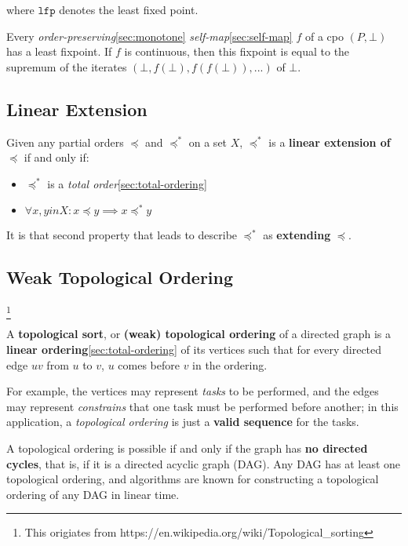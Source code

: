 where $\mathtt{lfp}$ denotes the least fixed point.


Every \textit{order-preserving}\ref{sec:monotone}
\textit{self-map}\ref{sec:self-map} $f$ of a cpo $(P, \bot)$ has a
least fixpoint. If $f$ is continuous, then this fixpoint is equal to
the supremum of the iterates $(\bot, f(\bot), f(f(\bot)), ...)$ of
$\bot$.


\subsection{Linear Extension}
\label{sec:linear-extension}

Given any partial orders $\preceq$ and $\preceq^*$ on a set $X$,
$\preceq^*$ is a \textbf{linear extension of $\preceq$} if and only if:

\begin{itemize}
\item $\preceq^*$ is a \textit{total order}\ref{sec:total-ordering}
\item $\forall x, y in X: x \preceq y \implies x \preceq^* y$
\end{itemize}

It is that second property that leads to describe $\preceq^*$ as
\textbf{extending} $\preceq$.


\subsection{Weak Topological Ordering}
\label{sec:wto}

\footnote{This origiates from
  https://en.wikipedia.org/wiki/Topological\_sorting}

A \textbf{topological sort}, or \textbf{(weak) topological ordering}
of a directed graph is a \textbf{linear
  ordering}\ref{sec:total-ordering} of its vertices such that for
every directed edge $uv$ from $u$ to $v$, $u$ comes before $v$ in the
ordering.

For example, the vertices may represent \textit{tasks} to be
performed, and the edges may represent \textit{constrains} that one
task must be performed before another; in this application, a
\textit{topological ordering} is just a \textbf{valid sequence} for
the tasks.

A topological ordering is possible if and only if the graph has
\textbf{no directed cycles}, that is, if it is a directed acyclic
graph (DAG). Any DAG has at least one topological ordering, and
algorithms are known for constructing a topological ordering of any
DAG in linear time.

